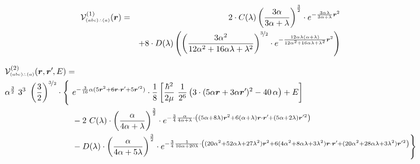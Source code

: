 \documentclass[onecolumn,preprint,superscriptaddress,nofootinbib,notitlepage,10pt,linenumbers]{revtex4-1}
\newcommand*{\mprime}{^{\prime}\mkern-1.2mu}
\newcommand{\la}{\label}
\newcommand{\ve}[1]{\ensuremath{\boldsymbol{#1}}}
\newcommand{\cc}{\ensuremath C(\lambda)}
\newcommand{\dd}{\ensuremath D(\lambda)}
\newcommand{\ebce}{\ensuremath $(abc)\wasytherefore(a)$}
\begin{document}
\begin{description}
\item[\ebce]
\begin{eqnarray}\la{eq.local.ebce}
\mathcal{V}^{(1)}_{\text{\tiny\ebce}}(\ve{r})&=&
2\cdot \cc\left(\frac{3\alpha}{3\alpha+\lambda}\right)^{\frac{3}{2}}\cdot
 e^{-\frac{3\alpha\lambda}{3\alpha+\lambda}\ve{r}^2}\\
&&+8\cdot\dd\left(
\left(\frac{3\alpha^2}{12\alpha^2+16\alpha\lambda+\lambda^2}\right)^{\nicefrac{3}{2}}\cdot e^{-\frac{12\alpha\lambda(\alpha+\lambda)}{12\alpha^2+16\alpha\lambda+\lambda^2}\ve{r}^2}
\right)
\end{eqnarray}


\begin{align}
\multispan2{$\displaystyle \mathcal{V}^{(2)}_{\text{\tiny\ebce}}(\ve{r},\ve{r}\mprime,E)=$\hfil}\\
\alpha^{\frac{3}{2}}~3^3~\left(\frac{3}{2}\right)^{\nicefrac{3}{2}}\cdot\Bigg\lbrace&~
e^{-\frac{3}{16}\alpha(5\ve{r}^2+6\ve{r}\cdot\ve{r}\mprime+5\ve{r}\mprime^2)}\cdot
\frac{1}{8}\left[\frac{\hbar^2}{2\mu}~\frac{1}{2^6}\left(3\cdot(5\alpha\ve{r}+3\alpha\ve{r}\mprime)^2-40\,\alpha\right)
+E\right]\\
&~-2~\cc\cdot\left(\frac{\alpha}{4\alpha+\lambda}\right)^{\frac{3}{2}}\cdot
 e^{-\frac{3}{4}\frac{\alpha}{4\alpha+\lambda}\cdot\left((5\alpha+8\lambda)\ve{r}^2+6(\alpha+\lambda)\ve{r}\cdot\ve{r}\mprime+(5\alpha+2\lambda)\ve{r}\mprime^2\right)}\\
&~-\dd\cdot\left(\frac{\alpha}{4\alpha+5\lambda}\right)^{\frac{3}{2}}\cdot
 e^{-\frac{3}{4}\frac{1}{16\alpha+20\lambda}\cdot\left((20\alpha^2+52\alpha\lambda+27\lambda^2)\ve{r}^2+6(4\alpha^2+8\alpha\lambda+3\lambda^2)\ve{r}\cdot\ve{r}\mprime+(20\alpha^2+28\alpha\lambda+3\lambda^2)\ve{r}\mprime^2\right)}\Bigg\rbrace\nonumber\\ 
 \la{eq.nonlocal.abca}
\end{align}


\end{description}

\newpage
\end{document}
